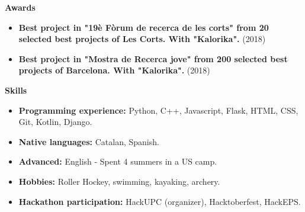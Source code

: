 \documentclass[letterpaper,12pt]{article}
\makeatletter
\newcommand{\resitem}[1]{\item #1 \vspace{-2pt}}
\newcommand{\resheading}[1]{{\large \colorbox{mygrey}{\begin{minipage}{\textwidth}{\textbf{#1 \vphantom{p\^{E}}}}\end{minipage}}}}
\newcommand{\ressubheading}[4]{
\begin{tabular*}{7.0in}{l@{\extracolsep{\fill}}r}
		\textbf{#1} & \textit{#4} \\
\end{tabular*}\vspace{-6pt}}
\makeatother
\begin{document}

\resheading{Awards}
	\begin{itemize}
		\resitem{\textbf{Best project in "19\`e F\`orum de recerca de les corts" from 20 selected best projects of Les Corts. With "Kalorika".} (2018)}
		\resitem{\textbf{Best project in "Mostra de Recerca jove" from 200 selected best projects of Barcelona. With "Kalorika".} (2018)}
	\end{itemize}



\resheading{Skills}
	\begin{itemize}
		\resitem{\textbf{Programming experience:} Python, C++, Javascript, Flask, HTML, CSS, Git, Kotlin, Django.}
		\resitem{\textbf{Native languages:} Catalan, Spanish.}
		\resitem{ \textbf{Advanced:} English - Spent 4 summers in a US camp.}
		\resitem{\textbf{Hobbies:} Roller Hockey, swimming, kayaking, archery.}
		\resitem{\textbf{Hackathon participation:} HackUPC (organizer), Hacktoberfest, HackEPS.}
	\end{itemize}
\end{document}
